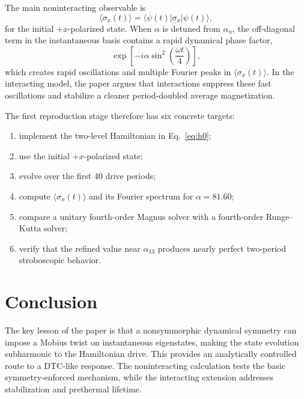 \documentclass[11pt,a4paper]{article}
\begin{document}
The main noninteracting observable is
\begin{equation}
\langle \sigma_x(t)\rangle = \langle \psi(t)|\sigma_x|\psi(t)\rangle ,
\end{equation}
for the initial \(+x\)-polarized state. When \(\alpha\) is detuned from \(\alpha_n\), the off-diagonal term in the instantaneous basis contains a rapid dynamical phase factor,
\begin{equation}
\exp\left[-i\alpha \sin^2\left(\frac{\omega t}{4}\right)\right],
\end{equation}
which creates rapid oscillations and multiple Fourier peaks in \(\langle\sigma_x(t)\rangle\). In the interacting model, the paper argues that interactions suppress these fast oscillations and stabilize a cleaner period-doubled average magnetization.

The first reproduction stage therefore has six concrete targets:
\begin{enumerate}
  \item implement the two-level Hamiltonian in Eq.~\eqref{eq:h0};
  \item use the initial \(+x\)-polarized state;
  \item evolve over the first 40 drive periods;
  \item compute \(\langle\sigma_x(t)\rangle\) and its Fourier spectrum for \(\alpha=81.60\);
  \item compare a unitary fourth-order Magnus solver with a fourth-order Runge--Kutta solver;
  \item verify that the refined value near \(\alpha_{13}\) produces nearly perfect two-period stroboscopic behavior.
\end{enumerate}

\section{Conclusion}

The key lesson of the paper is that a nonsymmorphic dynamical symmetry can impose a Mobius twist on instantaneous eigenstates, making the state evolution subharmonic to the Hamiltonian drive. This provides an analytically controlled route to a DTC-like response. The noninteracting calculation tests the basic symmetry-enforced mechanism, while the interacting extension addresses stabilization and prethermal lifetime.
\end{document}
